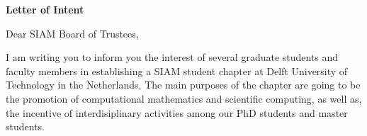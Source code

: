 \documentclass[letterpaper,12pt]{letter}
\begin{document}
\begin{letter}{\textbf{Letter of Intent}}

\opening{Dear SIAM Board of Trustees,}

I am writing you to inform you the interest of several graduate students and faculty members
in establishing a SIAM student chapter at Delft University of Technology in the Netherlands. 
The main purposes of the chapter are going to be the promotion of computational mathematics and scientific computing, 
as well as, the incentive of interdisiplinary activities among our PhD students and master students. 



\end{letter}
\end{document}
